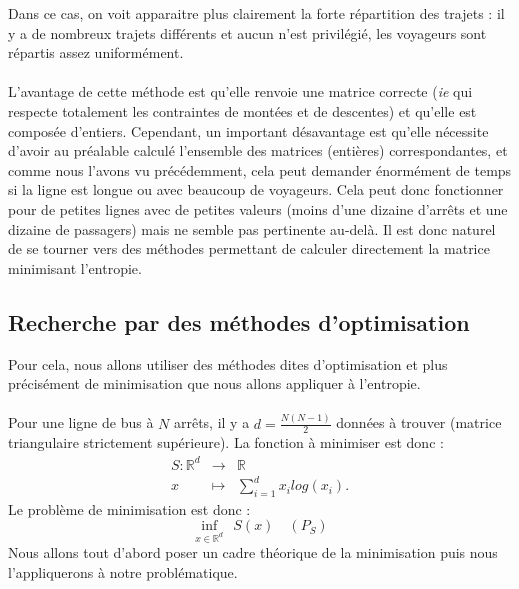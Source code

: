 \documentclass[12pt]{article}
\newcommand{\R}{\mathbb{R}}
\begin{document}
Dans ce cas, on voit apparaitre plus clairement la forte répartition des trajets : il y a de nombreux trajets différents et aucun n'est privilégié, les voyageurs sont répartis assez uniformément.\\
\\
L'avantage de cette méthode est qu'elle renvoie une matrice correcte (\textit{ie} qui respecte totalement les contraintes de montées et de descentes) et qu'elle est composée d'entiers. Cependant, un important désavantage est qu'elle nécessite d'avoir au préalable calculé l'ensemble des matrices (entières) correspondantes, et comme nous l'avons vu précédemment, cela peut demander énormément de temps si la ligne est longue ou avec beaucoup de voyageurs. Cela peut donc fonctionner pour de petites lignes avec de petites valeurs (moins d'une dizaine d'arrêts et une dizaine de passagers) mais ne semble pas pertinente au-delà. Il est donc naturel de se tourner vers des méthodes permettant de calculer directement la matrice minimisant l'entropie.
\subsection{Recherche par des méthodes d'optimisation}
Pour cela, nous allons utiliser des méthodes dites d'optimisation et plus précisément de minimisation que nous allons appliquer à l'entropie.\\
\\
Pour une ligne de bus à $N$ arrêts, il y a $d = \frac{N(N-1)}{2}$ données à trouver (matrice triangulaire strictement supérieure). La fonction à minimiser est donc :
\[\begin{array}{rcl}
S:\R^d&\to& \R\\
x &\mapsto &\sum_{i=1}^d x_ilog(x_i).
\end{array}
\]
Le problème de minimisation est donc :
\[
\inf_{x\in \R^d} \: \: S(x) \quad (P_S)
\]
Nous allons tout d'abord poser un cadre théorique de la minimisation puis nous l'appliquerons à notre problématique.
\end{document}
